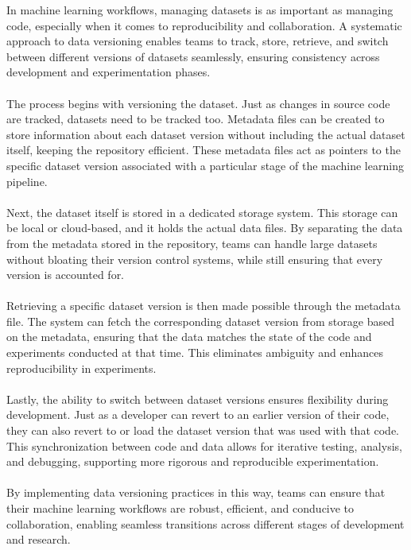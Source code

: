 In machine learning workflows, managing datasets is as important 
as managing code, especially when it comes to reproducibility and 
collaboration. A systematic approach to data versioning enables 
teams to track, store, retrieve, and switch between different 
versions of datasets seamlessly, ensuring consistency across 
development and experimentation phases. \cite{wandb, pulicharla2024data}
\\\\
The process begins with versioning the dataset. Just as changes 
in source code are tracked, datasets need to be tracked too. 
Metadata files can be created to store information about each 
dataset version without including the actual dataset itself, 
keeping the repository efficient. These metadata files act as 
pointers to the specific dataset version associated with a 
particular stage of the machine learning pipeline. 
\cite{pulicharla2024data, opendatascience}
\\\\
Next, the dataset itself is stored in a dedicated storage 
system. This storage can be local or cloud-based, and it holds 
the actual data files. By separating the data from the metadata 
stored in the repository, teams can handle large datasets without 
bloating their version control systems, while still ensuring that 
every version is accounted for.\cite{opendatascience}
\\\\
Retrieving a specific dataset version is then made possible 
through the metadata file. The system can fetch the corresponding 
dataset version from storage based on the metadata, ensuring 
that the data matches the state of the code and experiments 
conducted at that time. This eliminates ambiguity and enhances 
reproducibility in experiments. \cite{opendatascience, yizhenzhao}
\\\\
Lastly, the ability to switch between dataset versions ensures 
flexibility during development. Just as a developer can revert 
to an earlier version of their code, they can also revert to or 
load the dataset version that was used with that code. This 
synchronization between code and data allows for iterative 
testing, analysis, and debugging, supporting more rigorous and 
reproducible experimentation. \cite{opendatascience, yizhenzhao}
\\\\
By implementing data versioning practices in this way, teams 
can ensure that their machine learning workflows are robust, 
efficient, and conducive to collaboration, enabling seamless 
transitions across different stages of development and research.
\cite{wandb, opendatascience, yizhenzhao}

